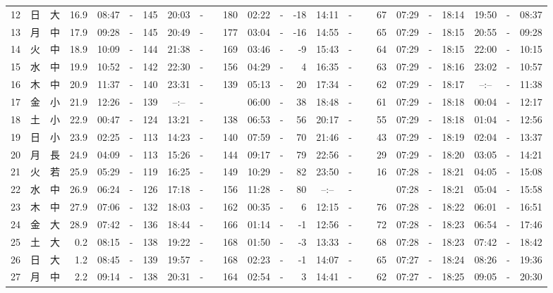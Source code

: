 \documentclass[12pt,a4j]{jsarticle}
\begin{document}
\begin{table}[htbp]
\begin{center}
{\begin{tabular}{|rc|cr|ccrccr|ccrccr|ccc|ccc|}
12 & 日 & 大 & 16.9 &  08:47 &-& 145 &  20:03 &-& 180 &  02:22 &-& -18 &  14:11 &-&  67 & 07:29 & -& 18:14 & 19:50 & -& 08:37 \\
13 & 月 & 中 & 17.9 &  09:28 &-& 145 &  20:49 &-& 177 &  03:04 &-& -16 &  14:55 &-&  65 & 07:29 & -& 18:15 & 20:55 & -& 09:28 \\
14 & 火 & 中 & 18.9 &  10:09 &-& 144 &  21:38 &-& 169 &  03:46 &-&  -9 &  15:43 &-&  64 & 07:29 & -& 18:15 & 22:00 & -& 10:15 \\
15 & 水 & 中 & 19.9 &  10:52 &-& 142 &  22:30 &-& 156 &  04:29 &-&   4 &  16:35 &-&  63 & 07:29 & -& 18:16 & 23:02 & -& 10:57 \\
16 & 木 & 中 & 20.9 &  11:37 &-& 140 &  23:31 &-& 139 &  05:13 &-&  20 &  17:34 &-&  62 & 07:29 & -& 18:17 & --:-- & -& 11:38 \\
17 & 金 & 小 & 21.9 &  12:26 &-& 139 &  --:-- &-&~~~~~ &  06:00 &-&  38 &  18:48 &-&  61 & 07:29 & -& 18:18 & 00:04 & -& 12:17 \\
18 & 土 & 小 & 22.9 &  00:47 &-& 124 &  13:21 &-& 138 &  06:53 &-&  56 &  20:17 &-&  55 & 07:29 & -& 18:18 & 01:04 & -& 12:56 \\
19 & 日 & 小 & 23.9 &  02:25 &-& 113 &  14:23 &-& 140 &  07:59 &-&  70 &  21:46 &-&  43 & 07:29 & -& 18:19 & 02:04 & -& 13:37 \\
20 & 月 & 長 & 24.9 &  04:09 &-& 113 &  15:26 &-& 144 &  09:17 &-&  79 &  22:56 &-&  29 & 07:29 & -& 18:20 & 03:05 & -& 14:21 \\
21 & 火 & 若 & 25.9 &  05:29 &-& 119 &  16:25 &-& 149 &  10:29 &-&  82 &  23:50 &-&  16 & 07:28 & -& 18:21 & 04:05 & -& 15:08 \\
22 & 水 & 中 & 26.9 &  06:24 &-& 126 &  17:18 &-& 156 &  11:28 &-&  80 &  --:-- &-&~~~~~ & 07:28 & -& 18:21 & 05:04 & -& 15:58 \\
23 & 木 & 中 & 27.9 &  07:06 &-& 132 &  18:03 &-& 162 &  00:35 &-&   6 &  12:15 &-&  76 & 07:28 & -& 18:22 & 06:01 & -& 16:51 \\
24 & 金 & 大 & 28.9 &  07:42 &-& 136 &  18:44 &-& 166 &  01:14 &-&  -1 &  12:56 &-&  72 & 07:28 & -& 18:23 & 06:54 & -& 17:46 \\
25 & 土 & 大 &  0.2 &  08:15 &-& 138 &  19:22 &-& 168 &  01:50 &-&  -3 &  13:33 &-&  68 & 07:28 & -& 18:23 & 07:42 & -& 18:42 \\
26 & 日 & 大 &  1.2 &  08:45 &-& 139 &  19:57 &-& 168 &  02:23 &-&  -1 &  14:07 &-&  65 & 07:27 & -& 18:24 & 08:26 & -& 19:36 \\
27 & 月 & 中 &  2.2 &  09:14 &-& 138 &  20:31 &-& 164 &  02:54 &-&   3 &  14:41 &-&  62 & 07:27 & -& 18:25 & 09:05 & -& 20:30 \\

\end{tabular}}
\end{center}
\end{table}
\end{document}
